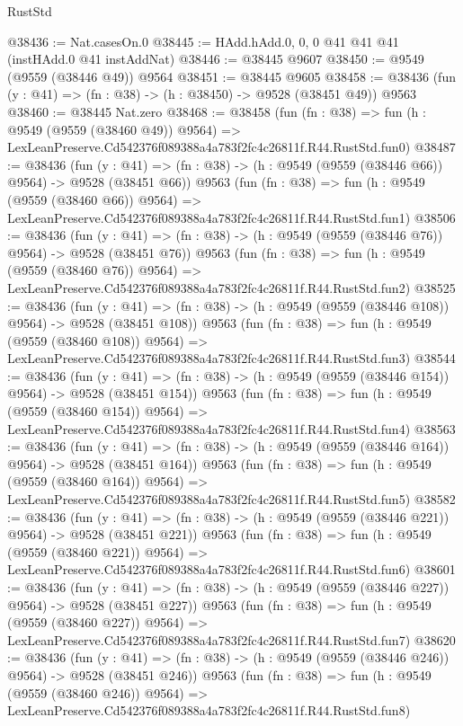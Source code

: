 \begin{lexlean}{RustStd}
\begin{coremodule}
@38436 := Nat.casesOn.{0}
@38445 := HAdd.hAdd.{0, 0, 0} @41 @41 @41 (instHAdd.{0} @41 instAddNat)
@38446 := @38445 @9607
@38450 := @9549 (@9559 (@38446 @49)) @9564
@38451 := @38445 @9605
@38458 := @38436 (fun (y : @41) => (fn : @38) -> (h : @38450) -> @9528 (@38451 @49)) @9563
@38460 := @38445 Nat.zero
@38468 := @38458
    (fun (fn : @38) =>
    fun (h : @9549 (@9559 (@38460 @49)) @9564) =>
    LexLeanPreserve.Cd542376f089388a4a783f2fc4c26811f.R44.RustStd.fun0)
@38487 := @38436
    (fun (y : @41) => (fn : @38) -> (h : @9549 (@9559 (@38446 @66)) @9564) -> @9528 (@38451 @66))
    @9563
    (fun (fn : @38) =>
    fun (h : @9549 (@9559 (@38460 @66)) @9564) =>
    LexLeanPreserve.Cd542376f089388a4a783f2fc4c26811f.R44.RustStd.fun1)
@38506 := @38436
    (fun (y : @41) => (fn : @38) -> (h : @9549 (@9559 (@38446 @76)) @9564) -> @9528 (@38451 @76))
    @9563
    (fun (fn : @38) =>
    fun (h : @9549 (@9559 (@38460 @76)) @9564) =>
    LexLeanPreserve.Cd542376f089388a4a783f2fc4c26811f.R44.RustStd.fun2)
@38525 := @38436
    (fun (y : @41) => (fn : @38) -> (h : @9549 (@9559 (@38446 @108)) @9564) -> @9528 (@38451 @108))
    @9563
    (fun (fn : @38) =>
    fun (h : @9549 (@9559 (@38460 @108)) @9564) =>
    LexLeanPreserve.Cd542376f089388a4a783f2fc4c26811f.R44.RustStd.fun3)
@38544 := @38436
    (fun (y : @41) => (fn : @38) -> (h : @9549 (@9559 (@38446 @154)) @9564) -> @9528 (@38451 @154))
    @9563
    (fun (fn : @38) =>
    fun (h : @9549 (@9559 (@38460 @154)) @9564) =>
    LexLeanPreserve.Cd542376f089388a4a783f2fc4c26811f.R44.RustStd.fun4)
@38563 := @38436
    (fun (y : @41) => (fn : @38) -> (h : @9549 (@9559 (@38446 @164)) @9564) -> @9528 (@38451 @164))
    @9563
    (fun (fn : @38) =>
    fun (h : @9549 (@9559 (@38460 @164)) @9564) =>
    LexLeanPreserve.Cd542376f089388a4a783f2fc4c26811f.R44.RustStd.fun5)
@38582 := @38436
    (fun (y : @41) => (fn : @38) -> (h : @9549 (@9559 (@38446 @221)) @9564) -> @9528 (@38451 @221))
    @9563
    (fun (fn : @38) =>
    fun (h : @9549 (@9559 (@38460 @221)) @9564) =>
    LexLeanPreserve.Cd542376f089388a4a783f2fc4c26811f.R44.RustStd.fun6)
@38601 := @38436
    (fun (y : @41) => (fn : @38) -> (h : @9549 (@9559 (@38446 @227)) @9564) -> @9528 (@38451 @227))
    @9563
    (fun (fn : @38) =>
    fun (h : @9549 (@9559 (@38460 @227)) @9564) =>
    LexLeanPreserve.Cd542376f089388a4a783f2fc4c26811f.R44.RustStd.fun7)
@38620 := @38436
    (fun (y : @41) => (fn : @38) -> (h : @9549 (@9559 (@38446 @246)) @9564) -> @9528 (@38451 @246))
    @9563
    (fun (fn : @38) =>
    fun (h : @9549 (@9559 (@38460 @246)) @9564) =>
    LexLeanPreserve.Cd542376f089388a4a783f2fc4c26811f.R44.RustStd.fun8)

\end{coremodule}
\end{lexlean}
